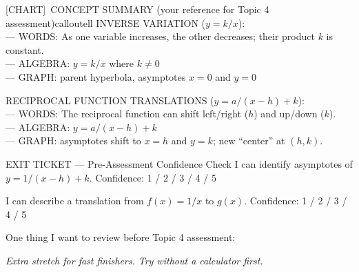 \documentclass[11pt]{article}
\newcommand{\IconChart}{[CHART]}
\begin{document}
\begin{callout}{\IconChart\ CONCEPT SUMMARY (your reference for Topic 4 assessment)}{calloutell}
INVERSE VARIATION (\(y = k/x\)):\\
\hspace*{1.5em}--- WORDS: As one variable increases, the other decreases; their product \(k\) is constant.\\
\hspace*{1.5em}--- ALGEBRA: \(y = k/x\) where \(k \neq 0\)\\
\hspace*{1.5em}--- GRAPH: parent hyperbola, asymptotes \(x = 0\) and \(y = 0\)

\medskip
RECIPROCAL FUNCTION TRANSLATIONS (\(y = a/(x-h) + k\)):\\
\hspace*{1.5em}--- WORDS: The reciprocal function can shift left/right (\(h\)) and up/down (\(k\)).\\
\hspace*{1.5em}--- ALGEBRA: \(y = a/(x-h) + k\)\\
\hspace*{1.5em}--- GRAPH: asymptotes shift to \(x = h\) and \(y = k\); new ``center'' at \((h, k)\).
\end{callout}


\begin{summaryexitbox}{EXIT TICKET --- Pre-Assessment Confidence Check}
I can identify asymptotes of \(y = 1/(x-h) + k\). \hfill Confidence: 1 / 2 / 3 / 4 / 5

I can describe a translation from \(f(x) = 1/x\) to \(g(x)\). \hfill Confidence: 1 / 2 / 3 / 4 / 5

One thing I want to review before Topic 4 assessment: \dotfill
\end{summaryexitbox}

\clearpage

\textit{Extra stretch for fast finishers. Try without a calculator first.}

\end{document}
